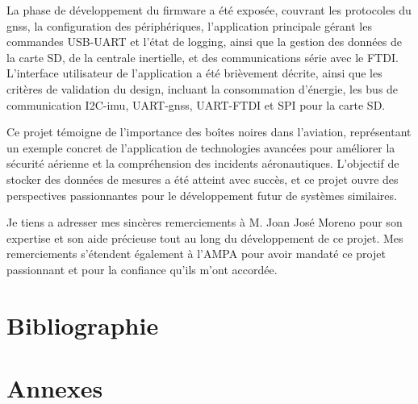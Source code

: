 \documentclass[12pt,a4paper,twoside]{article}
\begin{document}
La phase de développement du firmware a été exposée, couvrant les protocoles du \gls{gnss}, la configuration des périphériques, l'application principale gérant les commandes USB-UART et l'état de logging, ainsi que la gestion des données de la carte SD, de la centrale inertielle, et des communications série avec le \gls{FTDI}. L'interface utilisateur de l'application a été brièvement décrite, ainsi que les critères de validation du design, incluant la consommation d'énergie, les bus de communication I2C-\gls{imu}, UART-\gls{gnss}, UART-\gls{FTDI} et SPI pour la carte SD.

Ce projet témoigne de l'importance des boîtes noires dans l'aviation,  représentant un exemple concret de l'application de technologies avancées pour améliorer la sécurité aérienne et la compréhension des incidents aéronautiques. L'objectif de stocker des données de mesures a été atteint avec succès, et ce projet ouvre des perspectives passionnantes pour le développement futur de systèmes similaires.

Je tiens a adresser mes sincères remerciements à M. Joan José Moreno pour son expertise et son aide précieuse tout au long du développement de ce projet. Mes remerciements s'étendent également à l'AMPA pour avoir mandaté ce projet passionnant et pour la confiance qu'ils m'ont accordée.


\newpage
\nocite{*}
\section{Bibliographie}
 



\clearpage
\section{Annexes}






\end{document}
